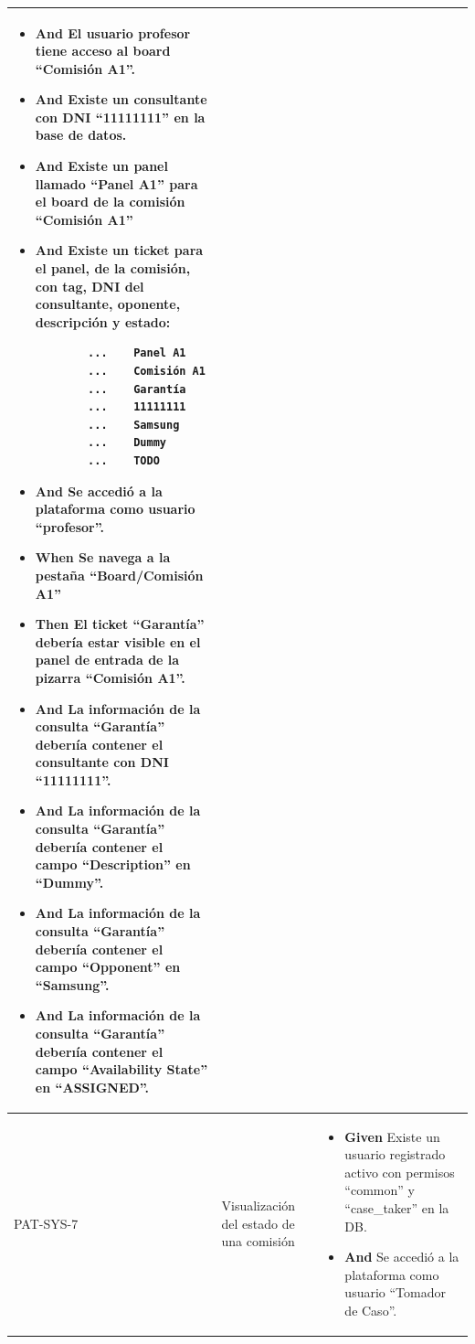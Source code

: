 \begin{longtable}{|p{1cm}|p{2.5cm}|p{12cm}|}
\begin{itemize}
        \item \textbf{And} El usuario profesor tiene acceso al board ``Comisión A1''.
        \item \textbf{And} Existe un consultante con DNI ``11111111'' en la base de datos.
        \item \textbf{And} Existe un panel llamado ``Panel A1'' para el board de la comisión ``Comisión A1''
        \item \textbf{And} Existe un ticket para el panel, de la comisión, con tag, DNI del consultante, oponente, descripción y estado:
        \begin{verbatim}
        ...    Panel A1
        ...    Comisión A1
        ...    Garantía
        ...    11111111
        ...    Samsung
        ...    Dummy
        ...    TODO
        \end{verbatim}
        \item \textbf{And} Se accedió a la plataforma como usuario ``profesor''.
        \newline
        \item \textbf{When} Se navega a la pestaña ``Board/Comisión A1''
        \newline
        \item \textbf{Then} El ticket ``Garant\'ia'' deber\'ia estar visible en el panel de entrada de la pizarra ``Comisión A1''.
        \item \textbf{And} La información de la consulta ``Garant\'ia'' deberı\'ia contener el consultante con DNI ``11111111''.
        \item \textbf{And} La información de la consulta ``Garant\'ia'' deberı\'ia contener el campo ``Description'' en ``Dummy''.
        \item \textbf{And} La información de la consulta ``Garant\'ia'' deberı\'ia contener el campo ``Opponent'' en ``Samsung''.
        \item \textbf{And} La información de la consulta ``Garant\'ia'' deberı\'ia contener el campo ``Availability State'' en ``ASSIGNED''.
    \end{itemize}
    \\ 
    \hline
    PAT-SYS-7 & Visualización del estado de una comisión & 
    \begin{itemize}
        \item \textbf{Given} Existe un usuario registrado activo con permisos ``common'' y ``case\_taker'' en la DB.
        \item \textbf{And} Se accedió a la plataforma como usuario ``Tomador de Caso''.

\end{itemize}
\end{longtable}

